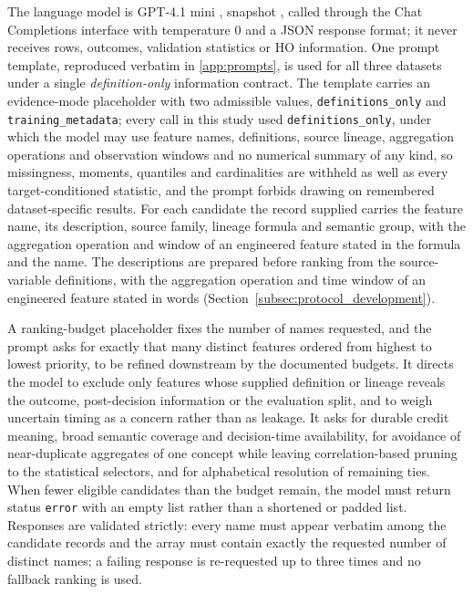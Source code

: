 \documentclass[final,5p,twocolumn]{elsarticle}
\begin{document}
The language model is GPT-4.1 mini \cite{openai2025gpt41}, snapshot , called through the Chat Completions interface with temperature 0 and a JSON response format; it never receives rows, outcomes, validation statistics or HO information. One prompt template, reproduced verbatim in \ref{app:prompts}, is used for all three datasets under a single \emph{definition-only} information contract. The template carries an evidence-mode placeholder with two admissible values, \texttt{definitions\_only} and \texttt{training\_metadata}; every call in this study used \texttt{definitions\_only}, under which the model may use feature names, definitions, source lineage, aggregation operations and observation windows and no numerical summary of any kind, so missingness, moments, quantiles and cardinalities are withheld as well as every target-conditioned statistic, and the prompt forbids drawing on remembered dataset-specific results. For each candidate the record supplied carries the feature name, its description, source family, lineage formula and semantic group, with the aggregation operation and window of an engineered feature stated in the formula and the name. The descriptions are prepared before ranking from the source-variable definitions, with the aggregation operation and time window of an engineered feature stated in words (Section~\ref{subsec:protocol_development}). 

A ranking-budget placeholder fixes the number of names requested, and the prompt asks for exactly that many distinct features ordered from highest to lowest priority, to be refined downstream by the documented budgets. It directs the model to exclude only features whose supplied definition or lineage reveals the outcome, post-decision information or the evaluation split, and to weigh uncertain timing as a concern rather than as leakage. It asks for durable credit meaning, broad semantic coverage and decision-time availability, for avoidance of near-duplicate aggregates of one concept while leaving correlation-based pruning to the statistical selectors, and for alphabetical resolution of remaining ties. When fewer eligible candidates than the budget remain, the model must return status \texttt{error} with an empty list rather than a shortened or padded list. Responses are validated strictly: every name must appear verbatim among the candidate records and the array must contain exactly the requested number of distinct names; a failing response is re-requested up to three times and no fallback ranking is used. 
\end{document}

